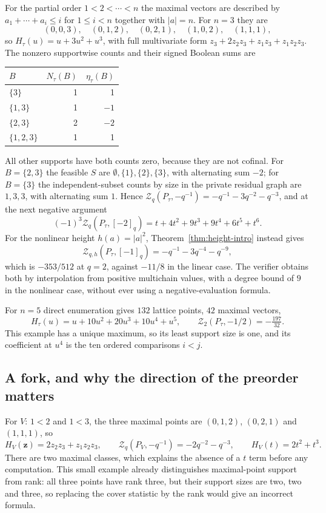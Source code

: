 \documentclass[11pt]{article}
\numberwithin{equation}{section}
\theoremstyle{definition}
\theoremstyle{remark}
\newcommand{\qint}[1]{[#1]_q}
\newcommand{\Zeta}{\mathcal Z}
\begin{document}
For the partial order $1<2<\cdots<n$ the maximal vectors are described by
$a_1+\cdots+a_i\le i$ for $1\le i<n$ together with $|a|=n$. For $n=3$ they are
\[
 (0,0,3),\quad(0,1,2),\quad(0,2,1),\quad(1,0,2),\quad(1,1,1),
\]
so $H_\tau(u)=u+3u^2+u^3$, with full multivariate form
$z_3+2z_2z_3+z_1z_3+z_1z_2z_3$. The nonzero supportwise counts and their
signed Boolean sums are
\begin{center}
\begin{tabular}{@{}lrr@{}}
\toprule
$B$ & $N_\tau(B)$ & $\eta_\tau(B)$\\
\midrule
$\{3\}$ & 1 & 1\\
$\{1,3\}$ & 1 & $-1$\\
$\{2,3\}$ & 2 & $-2$\\
$\{1,2,3\}$ & 1 & 1\\
\bottomrule
\end{tabular}
\end{center}
All other supports have both counts zero, because they are not cofinal. For
$B=\{2,3\}$ the feasible $S$ are $\emptyset,\{1\},\{2\},\{3\}$, with
alternating sum $-2$; for $B=\{3\}$ the independent-subset counts by size in
the private residual graph are $1,3,3$, with alternating sum $1$. Hence
$\Zeta_q(P_\tau,-q^{-1})=-q^{-1}-3q^{-2}-q^{-3}$, and at the next negative
argument
\[
 (-1)^3\Zeta_q(P_\tau,\qint{-2})=t+4t^2+9t^3+9t^4+6t^5+t^6 .
\]
For the nonlinear height $h(a)=|a|^2$, Theorem~\ref{thm:height-intro} instead
gives
\[
 \Zeta_{q,h}(P_\tau,\qint{-1})=-q^{-1}-3q^{-4}-q^{-9},
\]
which is $-353/512$ at $q=2$, against $-11/8$ in the linear case. The verifier
obtains both by interpolation from positive multichain values, with a degree
bound of $9$ in the nonlinear case, without ever using a negative-evaluation
formula.

For $n=5$ direct enumeration gives $132$ lattice points, $42$ maximal vectors,
\[
 H_\tau(u)=u+10u^2+20u^3+10u^4+u^5,
 \qquad \Zeta_2(P_\tau,-1/2)=-\tfrac{197}{32}.
\]
This example has a unique maximum, so its least support size is one, and its
coefficient at $u^4$ is the ten ordered comparisons $i<j$.

\subsection{A fork, and why the direction of the preorder matters}

For $V$: $1<2$ and $1<3$, the three maximal points are $(0,1,2)$, $(0,2,1)$
and $(1,1,1)$, so
\[
 H_V(\mathbf z)=2z_2z_3+z_1z_2z_3,\qquad
 \Zeta_q(P_V,-q^{-1})=-2q^{-2}-q^{-3},\qquad H_V(t)=2t^2+t^3 .
\]
There are two maximal classes, which explains the absence of a $t$ term before
any computation. This small example already distinguishes maximal-point
support from rank: all three points have rank three, but their support sizes
are two, two and three, so replacing the cover statistic by the rank would
give an incorrect formula.
\end{document}
